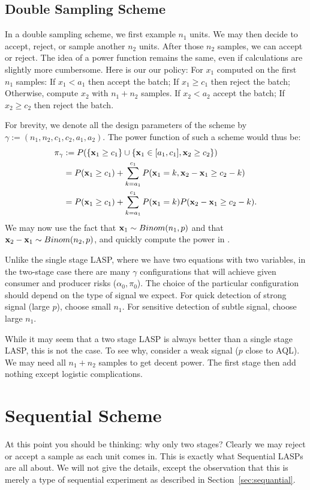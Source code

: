 \subsection{Double Sampling Scheme}
In a double sampling scheme, we first example $n_1$ units. 
We may then decide to accept, reject, or sample another $n_2$ units. 
After those $n_2$ samples, we can accept or reject. 
The idea of a power function remains the same, even if calculations are slightly more cumbersome.
Here is our our policy:
For $x_1$ computed on the first $n_1$ samples:
If $x_1  < a_1$ then accept the batch;
If $x_1 \geq  c_1$ then reject the batch;
Otherwise, compute $x_2$ with $n_1+n_2$ samples.
If $x_2 < a_2$ accept the batch;
If $x_2 \geq c_2$ then reject the batch.

For brevity, we denote all the design parameters of the scheme by $\gamma:= (n_1,n_2,c_1,c_2,a_1,a_2)$. 
The power function of such a scheme would thus be:
\begin{align}
	\pi_\gamma &:= P(\{ \mathbf{x}_1 \geq c_1 \} \cup \{ \mathbf{x}_1 \in [a_1,c_1], \mathbf{x}_2 \geq c_2 \}) \\
	&= P(\mathbf{x}_1 \geq c_1) + \sum_{k=a_1}^{c_1} P(\mathbf{x}_1 =k, \mathbf{x}_2-\mathbf{x}_1 \geq c_2-k) \\
		&= P(\mathbf{x}_1 \geq c_1) + \sum_{k=a_1}^{c_1} P(\mathbf{x}_1 =k) P(\mathbf{x}_2-\mathbf{x}_1 \geq c_2-k).
\end{align}
We may now use the fact that $\mathbf{x}_1 \sim Binom(n_1,p)$ and that $\mathbf{x}_2-\mathbf{x}_1 \sim Binom(n_2,p)$, and quickly compute the power in \R.

\begin{remark}[Redundancy]
Unlike the single stage LASP, where we have two equations with two variables, in the two-stage case there are many $\gamma$ configurations that will achieve given consumer and producer risks ($\alpha_0,\pi_0$).
The choice of the particular configuration should depend on the type of signal we expect. 
For quick detection of strong signal (large $p$), choose small $n_1$. 
For sensitive detection of subtle signal, choose large $n_1$. 
\end{remark}

\begin{remark}
While it may seem that a two stage LASP is always better than a single stage LASP, this is not the case.
To see why, consider a weak signal ($p$ close to AQL). We may need all $n_1+n_2$ samples to get decent power. The first stage then add nothing except logistic complications.
\end{remark}


\section{Sequential Scheme}
At this point you should be thinking: why only two stages? 
Clearly we may reject or accept a sample as each unit comes in.
This is exactly what Sequential LASPs are all about.
We will not give the details, except the observation that this is merely a type of sequential experiment as described in Section~\ref{sec:sequantial}.
